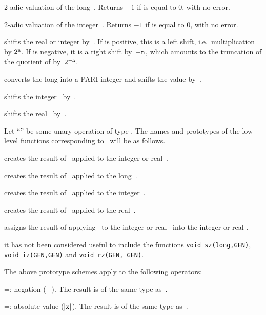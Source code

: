 
 2-adic valuation of the long~. Returns $-1$
if  is equal to 0, with no error.

 2-adic valuation of the integer~. Returns $-1$
if  is equal to 0, with no error.

 shifts the real or
integer  by~. If  is positive, this is a left shift,
i.e.~multiplication by $2^{{\tt n}}$. If  is negative, it is a right
shift by~$-{\tt n}$, which amounts to the truncation of the quotient of 
by~$2^{-{\tt n}}$.

 converts the long  into a PARI
integer and shifts the value by~.

 shifts the integer~ by~.

 shifts the real~ by~.


\noindent
Let ``\op'' be some unary operation of type . The names and
prototypes of the low-level functions corresponding to \op\ will be as follows.

 creates the result of \op\ applied to the integer
or real~.

 creates the result of \op\ applied to the
long~.

 creates the result of \op\ applied to the
integer~.

 creates the result of \op\ applied to the real~.

 assigns the result of applying \op\ to the
integer or real~ into the integer or real .

 it has not been considered useful to include the
functions {\tt void \op sz(long,GEN)}, {\tt void \op iz(GEN,GEN)} and
{\tt void \op rz(GEN, GEN)}.
\smallskip

\noindent The above prototype schemes apply to the following operators:

\op=: negation ($-$). The result is of the same type
as~.

\op=: absolute value ($|{\tt x}|$). The result is of the same type
as~.

